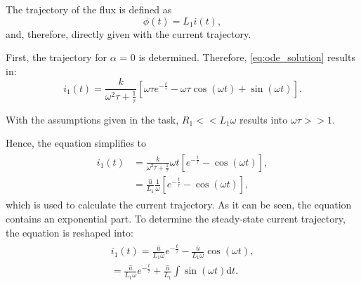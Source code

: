 \begin{solutionblock}
  The trajectory of the flux is defined as
  \begin{equation}
    \phi(t) = L_{\mathrm{1}} i(t),
  \end{equation}
  and, therefore, directly given with the current trajectory.
\end{solutionblock}




\begin{solutionblock}

  First, the trajectory for $\alpha$ = 0 is determined. Therefore, \eqref{eq:ode_solution} results in:
  \begin{equation}
    i_{\mathrm{1}}(t) = \frac{k}{\omega^2\tau+\frac{1}{\tau}} \left[\omega \tau e^{-\frac{t}{\tau}} - \omega \tau \cos(\omega t) + \sin(\omega t) \right].
  \end{equation}

  With the assumptions given in the task, $R_{\mathrm{1}} << L_{\mathrm{1}} \omega$
  results into $\omega \tau >> 1$.

  Hence, the equation simplifies to
  \begin{align}
    \begin{split}
      i_{\mathrm{1}}(t) &= \frac{k}{\omega^2\tau + \frac{1}{\tau}} \omega t \left[e^{-\frac{t}{\tau}} - \cos(\omega t) \right], \\
      &= \frac{\hat{u}}{L_{\mathrm{1}}} \frac{1}{\omega} \left[e^{-\frac{t}{\tau}} - \cos(\omega t) \right],
    \end{split}
  \end{align}
  which is used to calculate the current trajectory. 
  As it can be seen, the equation contains an exponential part. To determine the steady-state current trajectory, the equation is reshaped into:
  \begin{align}
    \begin{split}
    i_{\mathrm{1}}(t) = \frac{\hat{u}}{L_{\mathrm{1}}\omega}e^{-\frac{t}{\tau}}-\frac{\hat{u}}{L_{\mathrm{1}}\omega}\cos(\omega t), \\
    = \frac{\hat{u}}{L_{\mathrm{1}}\omega}e^{-\frac{t}{\tau}} + \frac{\hat{u}}{L_{\mathrm{1}}} \int \sin(\omega t) \mathrm{d}t.
    \end{split}
  \end{align}


\end{solutionblock}
